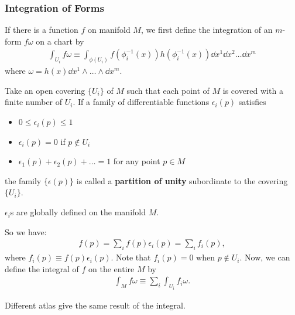 \documentclass[10pt]{article}
\begin{document}
\subsubsection{Integration of Forms}
If there is a function $f$ on manifold $M$, we first define the integration of an $m$-form $f\omega$ on a chart by
\begin{align}
    \int_{U_i}f\omega\equiv\int_{\phi(U_i)}f\left(\phi_{i}^{-1}(x)\right)h\left(\phi_{i}^{-1}(x)\right)\dd{x^1} \dd{x^2}\dots \dd{x^m}
\end{align}
where $\omega=h(x)\dd{x^1}\wedge\dots\wedge\dd{x^m}$.
\begin{definition}
    Take an open covering $\{U_i\}$ of $M$ such that each point of $M$ is covered with a finite number of $U_i$.
    If a family of differentiable functions $\epsilon_i(p)$ satisfies
    \begin{itemize}
        \item $0\le\epsilon_i(p)\le1$
        \item $\epsilon_i(p)=0$ if $p\notin U_i$
        \item $\epsilon_1(p)+\epsilon_2(p)+\dots=1$ for any point $p\in M$
    \end{itemize}
    the family $\{\epsilon(p)\}$ is called a \textbf{partition of unity} subordinate to the covering $\{U_i\}$.
\end{definition}
\begin{remark}
    $\epsilon_i$s are globally defined on the manifold $M$.
\end{remark}
So we have:
\begin{align}
    f(p)=\sum_{i}f(p)\epsilon_i(p)=\sum_i f_i(p),
\end{align}
where $f_i(p)\equiv f(p)\epsilon_i(p)$.
Note that $f_i(p)=0$ when $p\notin U_i$.
Now, we can define the integral of $f$ on the entire $M$ by
\begin{align}
    \int_M f\omega\equiv\sum_i \int_{U_i}f_i \omega.
\end{align}
\begin{remark}
    Different atlas give the same result of the integral.
\end{remark}
\end{document}
